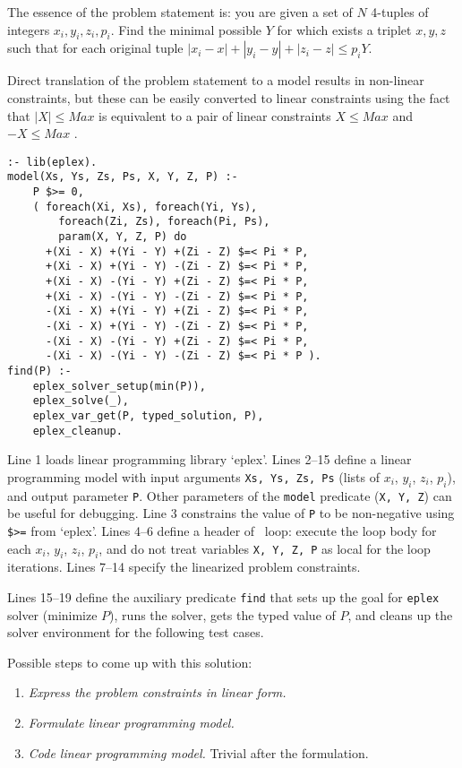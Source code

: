 \documentclass{acm_proc_article-sp}
\begin{document}
The essence of the problem statement is: you are given a set of $N$ 4-tuples of integers $x_i, y_i, z_i, p_i$. Find the minimal possible $Y$ for which exists a triplet $x, y, z$ such that 
for each original tuple $|x_i - x| + |y_i - y| + |z_i - z| \le p_iY$.

Direct translation of the problem statement to a model results in non-linear constraints,
but these can be easily converted to linear constraints using the fact that $|X| \le Max$ is equivalent to a pair of linear constraints $X \le Max$ and $-X \le Max$ \cite{lpsolve-abs}.

\begin{lstlisting}[caption={Linear programming solution for ``Star Wars''}]
:- lib(eplex).
model(Xs, Ys, Zs, Ps, X, Y, Z, P) :-
    P $>= 0,
    ( foreach(Xi, Xs), foreach(Yi, Ys), 
        foreach(Zi, Zs), foreach(Pi, Ps), 
        param(X, Y, Z, P) do 
      +(Xi - X) +(Yi - Y) +(Zi - Z) $=< Pi * P,
      +(Xi - X) +(Yi - Y) -(Zi - Z) $=< Pi * P,
      +(Xi - X) -(Yi - Y) +(Zi - Z) $=< Pi * P,
      +(Xi - X) -(Yi - Y) -(Zi - Z) $=< Pi * P,
      -(Xi - X) +(Yi - Y) +(Zi - Z) $=< Pi * P,
      -(Xi - X) +(Yi - Y) -(Zi - Z) $=< Pi * P,
      -(Xi - X) -(Yi - Y) +(Zi - Z) $=< Pi * P,
      -(Xi - X) -(Yi - Y) -(Zi - Z) $=< Pi * P ).
find(P) :-
    eplex_solver_setup(min(P)),
    eplex_solve(_),
    eplex_var_get(P, typed_solution, P),
    eplex_cleanup.
\end{lstlisting}

Line 1 loads linear programming library `eplex'.
Lines 2--15 define a linear programming model with input arguments \texttt{Xs, Ys, Zs, Ps} (lists of $x_i$, $y_i$, $z_i$, $p_i$),
and output parameter \texttt{P}. Other parameters of the \texttt{model} predicate (\texttt{X, Y, Z}) can be useful for debugging.
Line 3 constrains the value of \texttt{P} to be non-negative using \texttt{\$>=} from `eplex'. 
Lines 4--6 define a header of \eclipse\ loop: execute the loop body for each $x_i$, $y_i$, $z_i$, $p_i$, and do not treat variables \texttt{X, Y, Z, P} as local for the loop iterations.
Lines 7--14 specify the linearized problem constraints.

Lines 15--19 define the auxiliary predicate \texttt{find} that sets up the goal for \texttt{eplex} solver (minimize $P$), runs the solver, 
gets the typed value of $P$, and cleans up the solver environment for the following test cases. 

Possible steps to come up with this solution:

\begin{enumerate}
\item \textit{Express the problem constraints in linear form.}
\item \textit{Formulate linear programming model.}
\item \textit{Code linear programming model.} Trivial after the formulation.
\end{enumerate}
\end{document}

